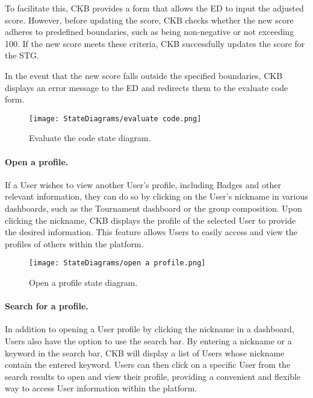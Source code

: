 To facilitate this, CKB provides a form that allows the ED to input the adjusted score. However, before updating the score, CKB checks whether the new score adheres to predefined boundaries, such as being non-negative or not exceeding 100. If the new score meets these criteria, CKB successfully updates the score for the STG.

In the event that the new score falls outside the specified boundaries, CKB displays an error message to the ED and redirects them to the evaluate code form.

\begin{figure}[H]
    \begin{center}
        \texttt{[image: StateDiagrams/evaluate code.png]}
        \caption{Evaluate the code state diagram.}
        \label{fig:evaluate_code_sd}%
    \end{center}
\end{figure}

\paragraph{Open a profile.}
If a User wishes to view another User's profile, including Badges and other relevant information, they can do so by clicking on the User's nickname in various dashboards, such as the Tournament dashboard or the group composition. Upon clicking the nickname, CKB displays the profile of the selected User to provide the desired information. This feature allows Users to easily access and view the profiles of others within the platform.

\begin{figure}[H]
    \begin{center}
        \texttt{[image: StateDiagrams/open a profile.png]}
        \caption{Open a profile state diagram.}
        \label{fig:open_profile_sd}%
    \end{center}
\end{figure}

\paragraph{Search for a profile.}
In addition to opening a User profile by clicking the nickname in a dashboard, Users also have the option to use the search bar. By entering a nickname or a keyword in the search bar, CKB will display a list of Users whose nickname contain the entered keyword. Users can then click on a specific User from the search results to open and view their profile, providing a convenient and flexible way to access User information within the platform.

